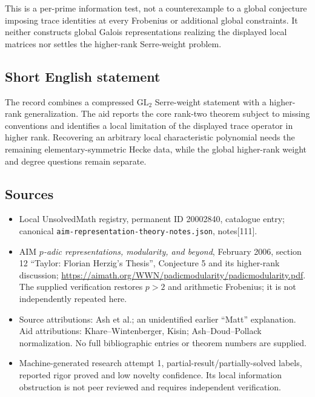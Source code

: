 \documentclass[11pt]{article}
\begin{document}
This is a per-prime information test, not a counterexample to a global conjecture imposing trace identities at every Frobenius or additional global constraints. It neither constructs global Galois representations realizing the displayed local matrices nor settles the higher-rank Serre-weight problem.
\subsection{Short English statement}
The record combines a compressed \(\mathrm{GL}_2\) Serre-weight statement with a higher-rank generalization. The aid reports the core rank-two theorem subject to missing conventions and identifies a local limitation of the displayed trace operator in higher rank. Recovering an arbitrary local characteristic polynomial needs the remaining elementary-symmetric Hecke data, while the global higher-rank weight and degree questions remain separate.
\subsection{Sources}
\begin{itemize}
\item Local UnsolvedMath registry, permanent ID 20002840, catalogue entry; canonical \texttt{aim-representation-theory-notes.json}, notes[111].
\item AIM \emph{\(p\)-adic representations, modularity, and beyond}, February 2006, section 12 ``Taylor: Florian Herzig's Thesis'', Conjecture 5 and its higher-rank discussion; \url{https://aimath.org/WWN/padicmodularity/padicmodularity.pdf}. The supplied verification restores \(p>2\) and arithmetic Frobenius; it is not independently repeated here.
\item Source attributions: Ash et al.; an unidentified earlier ``Matt'' explanation. Aid attributions: Khare--Wintenberger, Kisin; Ash--Doud--Pollack normalization. No full bibliographic entries or theorem numbers are supplied.
\item Machine-generated research attempt 1, partial-result/partially-solved labels, reported rigor proved and low novelty confidence. Its local information obstruction is not peer reviewed and requires independent verification.
\end{itemize}
\end{document}

